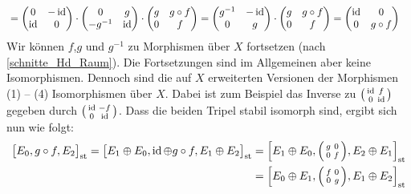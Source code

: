 \begin{beweis}
\begin{enumerate}[(i)]
\begin{align*}
		&= \begin{pmatrix} 0 & -\id \\ \id & 0 \end{pmatrix} \cdot 
		\begin{pmatrix}	0 & g \\ - g^{-1} & \id \end{pmatrix} \cdot 
		\begin{pmatrix} g & g \circ f \\ 0 & f \end{pmatrix} = 
		\begin{pmatrix}	g ^{-1} & -\id \\ 0 & g \end{pmatrix} \cdot 
		\begin{pmatrix} g & g \circ f \\ 0 & f \end{pmatrix} = 
		\begin{pmatrix}\id & 0 \\ 0 & g \circ f \end{pmatrix}
	\end{align*}
	Wir können $f$,$g$ und $g^{-1}$ zu Morphismen über $X$ fortsetzen (nach \autoref{schnitte_Hd_Raum}). Die Fortsetzungen sind im Allgemeinen aber keine Isomorphismen.
	Dennoch sind die auf $X$ erweiterten Versionen der Morphismen (1) -- (4) Isomorphismen über $X$. Dabei ist zum Beispiel das Inverse zu $\begin{psmallmatrix}
		\id & f \\ 0 &\id
	\end{psmallmatrix}$ gegeben durch $\begin{psmallmatrix}
		\id & -f \\ 0 & \id
	\end{psmallmatrix}$. Dass die beiden Tripel stabil isomorph sind, ergibt sich nun wie folgt:
	\begin{align*}
		\benbrace[\big]{E_0 , g \circ f, E_2}_\st =
		\benbrace[\big]{E_1 \oplus  E_0, \id \oplus g \circ f, E_1 \oplus E_2}_{\st} &= \benbrace*{E_1 \oplus E_0, \begin{psmallmatrix}
			g & 0 \\ 0 &f
		\end{psmallmatrix}, E_2 \oplus E_1}_{\st}  \\ 
		&= \benbrace*{E_0 \oplus E_1, \begin{psmallmatrix}
			f & 0 \\ 0 &g
		\end{psmallmatrix}, E_1 \oplus E_2}_{\st} 
	\end{align*}

\end{enumerate}
\end{beweis}
